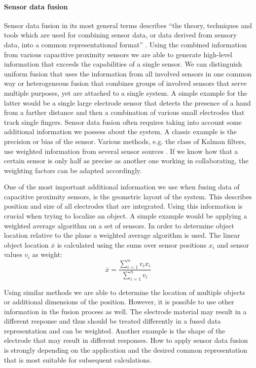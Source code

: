 \paragraph{Sensor data fusion}
Sensor data fusion in its most general terms describes “the theory, techniques and tools which are used for combining sensor data, or data derived from sensory data, into a common representational format” \cite{mitchell2007introduction}. Using the combined information from various capacitive proximity sensors we are able to generate high-level information that exceeds the capabilities of a single sensor. We can distinguish uniform fusion that uses the information from all involved sensors in one common way or heterogeneous fusion that combines groups of involved sensors that serve multiple purposes, yet are attached to a single system. A simple example for the latter would be a single large electrode sensor that detects the presence of a hand from a farther distance and then a combination of various small electrodes that track single fingers. 
Sensor data fusion often requires taking into account some additional information we possess about the system. A classic example is the precision or bias of the sensor. Various methods, e.g. the class of Kalman filters, use weighted information from several sensor sources \cite{welch1995introduction}. If we know how that a certain sensor is only half as precise as another one working in collaborating, the weighting factors can be adapted accordingly. 

One of the most important additional information we use when fusing data of capacitive proximity sensors, is the geometric layout of the system. This describes position and size of all electrodes that are integrated. Using this information is crucial when trying to localize an object. A simple example would be applying a weighted average algorithm on a set of sensors. In order to determine object location relative to the plane a weighted average algorithm is used. The linear object location $\overline{x}$ is calculated using the sums over sensor positions $x_i$ and sensor values $v_i$ as weight:
\[\overline{x}=\frac{\sum^n_{i=1}{v_i x_i}}{\sum^n_{i=1}{v_i}}\]

Using similar methods we are able to determine the location of multiple objects or additional dimensions of the position.
However, it is possible to use other information in the fusion process as well. The electrode material may result in a different response and thus should be treated differently in a fused data representation and can be weighted. Another example is the shape of the electrode that may result in different responses. How to apply sensor data fusion is strongly depending on the application and the desired common representation that is most suitable for subsequent calculations.

